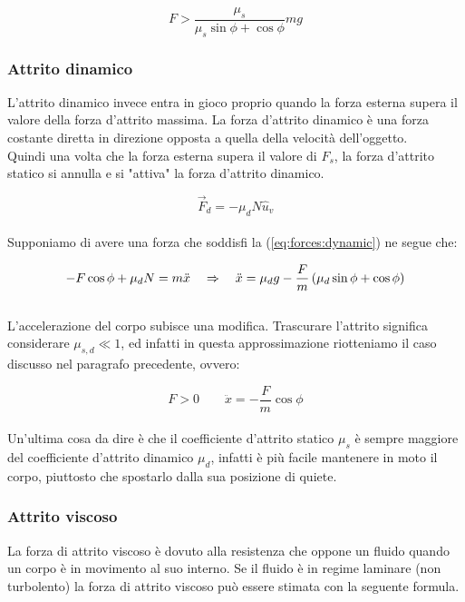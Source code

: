 \begin{equation}
    F > \frac{\mu_s}{\mu_s\sin\phi+\cos\phi}mg
\end{equation}

\subsubsection{Attrito dinamico}
L'attrito dinamico invece entra in gioco proprio quando la forza esterna
supera il valore della forza d'attrito massima. La forza d'attrito dinamico
è una forza costante diretta in direzione opposta a quella della velocità
dell'oggetto.\\
Quindi una volta che la forza esterna supera il valore di $F_s$,
la forza d'attrito statico si annulla e si "attiva" la forza d'attrito dinamico.

\begin{equation}
    \vec F_d = -\mu_dN\hat u_v
\label{eq:forces:dynamic}
\end{equation}
\\
Supponiamo di avere una forza che soddisfi la (\ref{eq:forces:dynamic})
ne segue che:

\begin{equation}
    -F\cos\phi + \mu_dN = m\ddot x \quad\Rightarrow\quad \ddot x =
    \mu_dg-\frac Fm\left(\mu_d\sin\phi + \cos\phi\right)
\end{equation}
\\
L'accelerazione del corpo subisce una modifica. Trascurare l'attrito
significa considerare $\mu_{s,d}\ll 1$, ed infatti in questa approssimazione
riotteniamo il caso discusso nel paragrafo precedente, ovvero:

\begin{equation}
    F>0\quad\quad \ddot x = -\frac Fm\cos\phi
\end{equation}
\\
Un'ultima cosa da dire è che il coefficiente d'attrito statico $\mu_s$ è
sempre maggiore del coefficiente d'attrito dinamico $\mu_d$, infatti è più
facile mantenere in moto il corpo, piuttosto che spostarlo dalla sua
posizione di quiete.

\subsubsection{Attrito viscoso}
La forza di attrito viscoso è dovuto alla resistenza che oppone un fluido
quando un corpo è in movimento al suo interno. Se il fluido è in regime
laminare (non turbolento) la forza di attrito viscoso può essere stimata
con la seguente formula.

